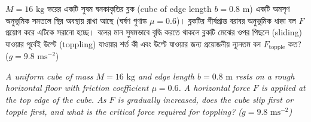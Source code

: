 \documentclass[12pt, a4paper]{article}
\begin{document}
\begin{tcolorbox}[questionbox={প্রশ্ন (Question) 38}]
\noindent
$M = 16\text{ kg}$ ভরের একটি সুষম ঘনকাকৃতির ব্লক (cube of edge length $b = 0.8\text{ m}$) একটি অমসৃণ অনুভূমিক সমতলে স্থির অবস্থায় রাখা আছে (ঘর্ষণ গুণাঙ্ক $\mu = 0.6$)। ব্লকটির শীর্ষপ্রান্ত বরাবর অনুভূমিক ধাক্কা বল $F$ প্রয়োগ করে এটিকে সরানো হচ্ছে। বলের মান সুষমভাবে বৃদ্ধি করতে থাকলে ব্লকটি মেঝের ওপর পিছলে (sliding) যাওয়ার পূর্বেই উল্টে (toppling) যাওয়ার শর্ত কী এবং উল্টে যাওয়ার জন্য প্রয়োজনীয় ন্যূনতম বল $F_{\text{topple}}$ কত? ($g = 9.8\text{ ms}^{-2}$)

\vspace{0.8em}
\begin{english}
\noindent\textit{\color{darkgray}
A uniform cube of mass $M = 16\text{ kg}$ and edge length $b = 0.8\text{ m}$ rests on a rough horizontal floor with friction coefficient $\mu = 0.6$. A horizontal force $F$ is applied at the top edge of the cube. As $F$ is gradually increased, does the cube slip first or topple first, and what is the critical force required for toppling? ($g = 9.8\text{ ms}^{-2}$)
}
\end{english}
\end{tcolorbox}
\end{document}
